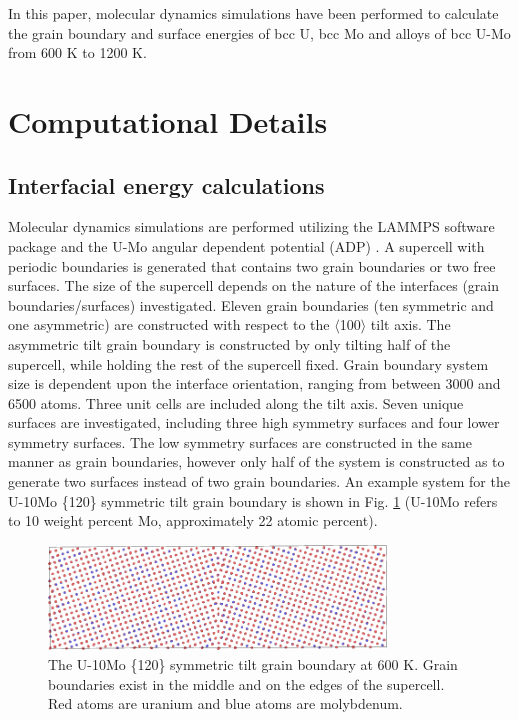 \documentclass[review]{elsarticle}
\begin{document}
In this paper, molecular dynamics simulations have been performed to calculate the grain boundary and surface energies of bcc U, bcc Mo and alloys of bcc U-Mo from 600 K to 1200 K. 

\section{Computational Details}
\subsection{Interfacial energy calculations}
Molecular dynamics simulations are performed utilizing the LAMMPS \cite{plimpton1995} software package and the U-Mo angular dependent potential (ADP) \cite{smirnovaADP}. A supercell with periodic boundaries is generated that contains two grain boundaries or two free surfaces. The size of the supercell depends on the nature of the interfaces (grain boundaries/surfaces) investigated. Eleven grain boundaries (ten symmetric and one asymmetric) are constructed with respect to the $\langle$100$\rangle$ tilt axis. The asymmetric tilt grain boundary is constructed by only tilting half of the supercell, while holding the rest of the supercell fixed. Grain boundary system size is dependent upon the interface orientation, ranging from between 3000 and 6500 atoms. Three unit cells are included along the tilt axis. Seven unique surfaces are investigated, including three high symmetry surfaces and four lower symmetry surfaces. The low symmetry surfaces are constructed in the same manner as grain boundaries, however only half of the system is constructed as to generate two surfaces instead of two grain boundaries. An example system for the U-10Mo \{120\} symmetric tilt grain boundary is shown in Fig. \ref{fig:gbex} (U-10Mo refers to 10 weight percent Mo, approximately 22 atomic percent).

\begin{figure}[h]
 \centering
 \includegraphics[width=0.8\textwidth]{gbex.png} 
 \caption{The U-10Mo \{120\} symmetric tilt grain boundary at 600 K. Grain boundaries exist in the middle and on the edges of the supercell. Red atoms are uranium and blue atoms are molybdenum.}
 \label{fig:gbex}
\end{figure}
\end{document}
